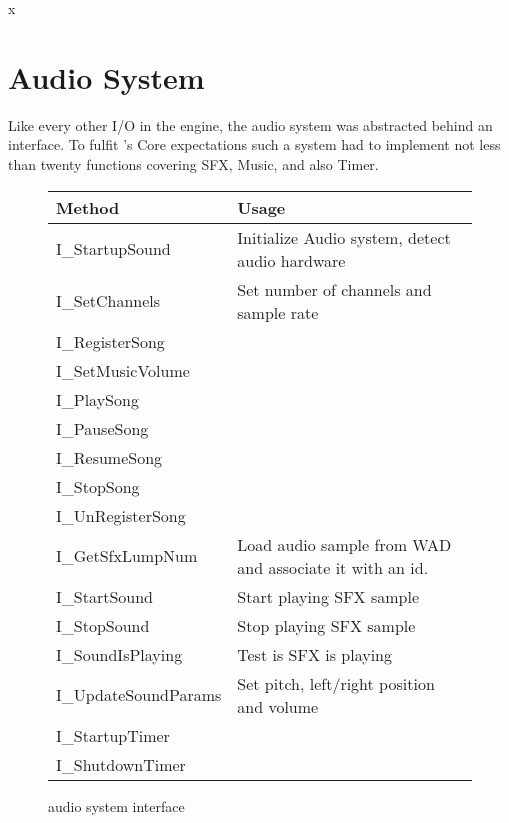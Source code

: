 x\section{Audio System}
\label{dmx_section}
Like every other I/O in the engine, the audio system was abstracted behind an interface. To fulfit \doom's Core expectations such a system had to implement not less than twenty functions covering SFX, Music, and also Timer.\\
\par
 \begin{figure}[H]
\centering  
\begin{tabularx}{\textwidth}{ L{0.6}  L{1.4}}
  \toprule
  \textbf{Method} &  \textbf{Usage}\\

  \toprule 
  I\_StartupSound & Initialize Audio system, detect audio hardware\\
  I\_SetChannels & Set number of channels and sample rate\\
  \toprule 
   
I\_RegisterSong & \\
I\_SetMusicVolume &\\
I\_PlaySong &\\
I\_PauseSong &\\
I\_ResumeSong &\\
I\_StopSong &\\
I\_UnRegisterSong & \\




  \toprule 
I\_GetSfxLumpNum & Load audio sample from WAD and associate it with an id.\\
I\_StartSound & Start playing SFX sample\\
I\_StopSound & Stop playing SFX sample\\
I\_SoundIsPlaying & Test is SFX is playing\\
I\_UpdateSoundParams & Set pitch, left/right position and volume\\

  \toprule 
  
I\_StartupTimer &\\
I\_ShutdownTimer &\\

   \toprule
\end{tabularx}
\caption{\doom audio system interface}
\end{figure}




